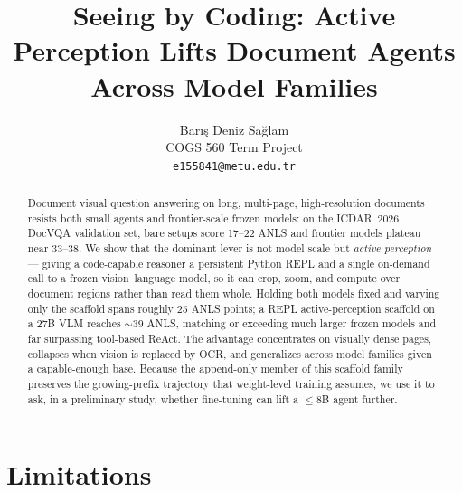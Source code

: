 \documentclass[11pt]{article}
\title{Seeing by Coding: Active Perception Lifts Document Agents Across Model Families}
\author{Bar\i{}\c{s} Deniz Sa\u{g}lam \\
  COGS 560 Term Project \\
  \texttt{e155841@metu.edu.tr} \\}
\begin{document}
\maketitle

\begin{abstract}
Document visual question answering on long, multi-page, high-resolution documents resists both small agents and frontier-scale frozen models: on the ICDAR~2026 DocVQA validation set, bare setups score 17--22 ANLS and frontier models plateau near 33--38. We show that the dominant lever is not model scale but \emph{active perception} --- giving a code-capable reasoner a persistent Python REPL and a single on-demand call to a frozen vision--language model, so it can crop, zoom, and compute over document regions rather than read them whole. Holding both models fixed and varying only the scaffold spans roughly 25 ANLS points; a REPL active-perception scaffold on a 27B VLM reaches $\sim$39 ANLS, matching or exceeding much larger frozen models and far surpassing tool-based ReAct. The advantage concentrates on visually dense pages, collapses when vision is replaced by OCR, and generalizes across model families given a capable-enough base. Because the append-only member of this scaffold family preserves the growing-prefix trajectory that weight-level training assumes, we use it to ask, in a preliminary study, whether fine-tuning can lift a $\leq$8B agent further.
\end{abstract}









\section*{Limitations}



\end{document}
